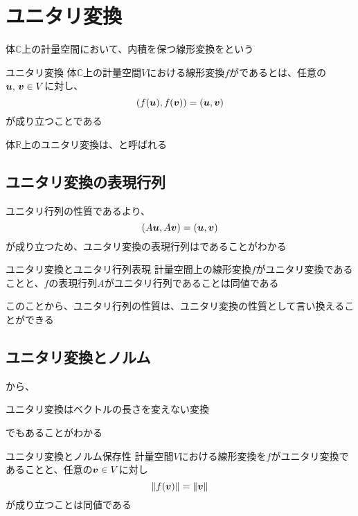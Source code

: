\documentclass[../../../topic_linear-algebra]{subfiles}
\begin{document}
\sectionline
\section{ユニタリ変換}

体$\mathbb{C}$上の計量空間において、内積を保つ線形変換をという

\begin{definition*}{ユニタリ変換}
  体$\mathbb{C}$上の計量空間$V$における線形変換$f$がであるとは、任意の$\vb*{u},\,\vb*{v} \in V$に対し、
  \begin{equation*}
    (f(\vb*{u}),f(\vb*{v})) = (\vb*{u},\vb*{v})
  \end{equation*}
  が成り立つことである
\end{definition*}

体$\mathbb{R}$上のユニタリ変換は、と呼ばれる

\subsection{ユニタリ変換の表現行列}

ユニタリ行列の性質であるより、
\begin{equation*}
  (A\vb*{u}, A\vb*{v}) = (\vb*{u}, \vb*{v})
\end{equation*}
が成り立つため、ユニタリ変換の表現行列はであることがわかる

\begin{theorem*}{ユニタリ変換とユニタリ行列表現}
  計量空間上の線形変換$f$がユニタリ変換であることと、$f$の表現行列$A$がユニタリ行列であることは同値である
\end{theorem*}

このことから、ユニタリ行列の性質は、ユニタリ変換の性質として言い換えることができる

\subsection{ユニタリ変換とノルム}

から、
\begin{shaded}
  ユニタリ変換はベクトルの長さを変えない変換
\end{shaded}
でもあることがわかる

\begin{theorem*}{ユニタリ変換とノルム保存性}
  計量空間$V$における線形変換を$f$がユニタリ変換であることと、任意の$\vb*{v} \in V$に対し
  \begin{equation*}
    \|f(\vb*{v})\| = \|\vb*{v}\|
  \end{equation*}
  が成り立つことは同値である
\end{theorem*}
\end{document}
